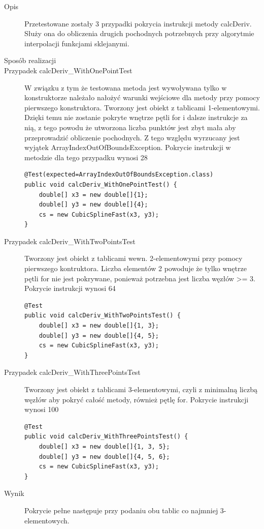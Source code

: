 \documentclass[12pt,a4paper,notitlepage]{article}
\begin{document}
\vspace*{5mm}
\begin{description}
\item [Opis] Przetestowane zostały 3 przypadki pokrycia instrukcji metody calcDeriv. Służy ona do obliczenia drugich pochodnych potrzebnych przy algorytmie interpolacji funkcjami sklejanymi.

\item [Sposób realizacji]

\item [Przypadek calcDeriv\_WithOnePointTest] W związku z tym że testowana metoda jest wywoływana tylko w konstruktorze należało nałożyć warunki wejściowe dla metody przy pomocy pierwszego konstruktora. Tworzony jest obiekt z tablicami 1-elementowymi. Dzięki temu nie zostanie pokryte wnętrze pętli for i dalsze instrukcje za nią, z tego powodu że utworzona liczba punktów jest zbyt mała aby przeprowadzić obliczenie pochodnych. Z tego względu wyrzucany jest wyjątek ArrayIndexOutOfBoundsException.
Pokrycie instrukcji w metodzie dla tego przypadku wynosi 28%

\begin{lstlisting}
@Test(expected=ArrayIndexOutOfBoundsException.class)
public void calcDeriv_WithOnePointTest() {
    double[] x3 = new double[]{1};
    double[] y3 = new double[]{4};
    cs = new CubicSplineFast(x3, y3);
}
\end{lstlisting}

\item [Przypadek calcDeriv\_WithTwoPointsTest] Tworzony jest obiekt z tablicami wewn. 2-elementowymi przy pomocy pierwszego kontruktora. Liczba elementów 2 powoduje że tylko wnętrze pętli for nie jest pokrywane, ponieważ potrzebna jest liczba węzłów >= 3.
Pokrycie instrukcji wynosi 64%

\begin{lstlisting}
@Test
public void calcDeriv_WithTwoPointsTest() {
    double[] x3 = new double[]{1, 3};
    double[] y3 = new double[]{4, 5};
    cs = new CubicSplineFast(x3, y3);
}
\end{lstlisting}

\item [Przypadek calcDeriv\_WithThreePointsTest] Tworzony jest obiekt z tablicami 3-elementowymi, czyli z minimalną liczbą węzłów aby pokryć całość metody, również pętlę for.
Pokrycie instrukcji wynosi 100%

\begin{lstlisting}
@Test
public void calcDeriv_WithThreePointsTest() {
    double[] x3 = new double[]{1, 3, 5};
    double[] y3 = new double[]{4, 5, 6};
    cs = new CubicSplineFast(x3, y3);
}
\end{lstlisting}

\item [Wynik] Pokrycie pełne następuje przy podaniu obu tablic co najmniej 3-elementowych.
\end{description}
\end{document}
